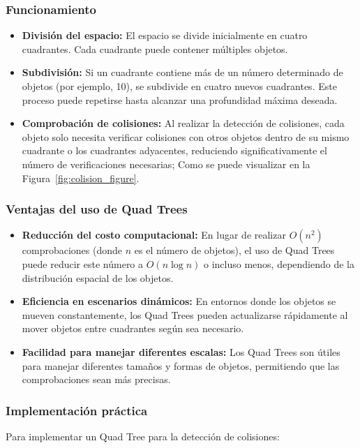 \documentclass[9pt,a4paper,twoside]{rho-class/rho}
\begin{document}
    \subsubsection{Funcionamiento}
    \begin{itemize}
        \item \textbf{División del espacio:} El espacio se divide inicialmente en cuatro cuadrantes. Cada cuadrante puede contener múltiples objetos.
        
        \item \textbf{Subdivisión:} Si un cuadrante contiene más de un número determinado de objetos (por ejemplo, 10), se subdivide en cuatro nuevos cuadrantes. Este proceso puede repetirse hasta alcanzar una profundidad máxima deseada.
        
        \item \textbf{Comprobación de colisiones:} Al realizar la detección de colisiones, cada objeto solo necesita verificar colisiones con otros objetos dentro de su mismo cuadrante o los cuadrantes adyacentes, reduciendo significativamente el número de verificaciones necesarias; Como se puede visualizar en la Figura~\ref{fig:colision_figure}.
    \end{itemize}

    \subsubsection{Ventajas del uso de Quad Trees}
    \begin{itemize}
        \item \textbf{Reducción del costo computacional:} En lugar de realizar $O(n^2)$ comprobaciones (donde $n$ es el número de objetos), el uso de Quad Trees puede reducir este número a $O(n\log n)$ o incluso menos, dependiendo de la distribución espacial de los objetos.
        
        \item \textbf{Eficiencia en escenarios dinámicos:} En entornos donde los objetos se mueven constantemente, los Quad Trees pueden actualizarse rápidamente al mover objetos entre cuadrantes según sea necesario.
        
        \item \textbf{Facilidad para manejar diferentes escalas:} Los Quad Trees son útiles para manejar diferentes tamaños y formas de objetos, permitiendo que las comprobaciones sean más precisas.
    \end{itemize}

    \subsubsection{Implementación práctica}
    Para implementar un Quad Tree para la detección de colisiones:
\end{document}
